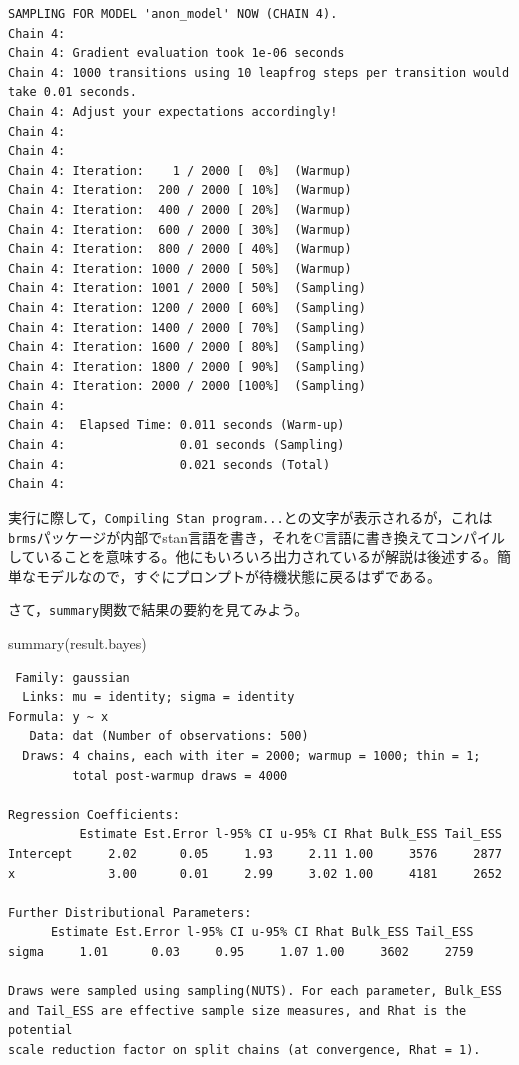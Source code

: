 \documentclass[
  a4paper,
]{ltjsbook}
\newenvironment{Shaded}{\begin{snugshade}}{\end{snugshade}}
\newcommand{\FunctionTok}[1]{\textcolor[rgb]{0.28,0.35,0.67}{#1}}
\newcommand{\NormalTok}[1]{\textcolor[rgb]{0.00,0.23,0.31}{#1}}
\begin{document}
\begin{verbatim}
SAMPLING FOR MODEL 'anon_model' NOW (CHAIN 4).
Chain 4: 
Chain 4: Gradient evaluation took 1e-06 seconds
Chain 4: 1000 transitions using 10 leapfrog steps per transition would take 0.01 seconds.
Chain 4: Adjust your expectations accordingly!
Chain 4: 
Chain 4: 
Chain 4: Iteration:    1 / 2000 [  0%]  (Warmup)
Chain 4: Iteration:  200 / 2000 [ 10%]  (Warmup)
Chain 4: Iteration:  400 / 2000 [ 20%]  (Warmup)
Chain 4: Iteration:  600 / 2000 [ 30%]  (Warmup)
Chain 4: Iteration:  800 / 2000 [ 40%]  (Warmup)
Chain 4: Iteration: 1000 / 2000 [ 50%]  (Warmup)
Chain 4: Iteration: 1001 / 2000 [ 50%]  (Sampling)
Chain 4: Iteration: 1200 / 2000 [ 60%]  (Sampling)
Chain 4: Iteration: 1400 / 2000 [ 70%]  (Sampling)
Chain 4: Iteration: 1600 / 2000 [ 80%]  (Sampling)
Chain 4: Iteration: 1800 / 2000 [ 90%]  (Sampling)
Chain 4: Iteration: 2000 / 2000 [100%]  (Sampling)
Chain 4: 
Chain 4:  Elapsed Time: 0.011 seconds (Warm-up)
Chain 4:                0.01 seconds (Sampling)
Chain 4:                0.021 seconds (Total)
Chain 4: 
\end{verbatim}

実行に際して，\texttt{Compiling\ Stan\ program...}との文字が表示されるが，これは\texttt{brms}パッケージが内部でstan言語を書き，それをC言語に書き換えてコンパイルしていることを意味する。他にもいろいろ出力されているが解説は後述する。簡単なモデルなので，すぐにプロンプトが待機状態に戻るはずである。

さて，\texttt{summary}関数で結果の要約を見てみよう。

\begin{Shaded}
\begin{Highlighting}[]
\FunctionTok{summary}\NormalTok{(result.bayes)}
\end{Highlighting}
\end{Shaded}

\begin{verbatim}
 Family: gaussian 
  Links: mu = identity; sigma = identity 
Formula: y ~ x 
   Data: dat (Number of observations: 500) 
  Draws: 4 chains, each with iter = 2000; warmup = 1000; thin = 1;
         total post-warmup draws = 4000

Regression Coefficients:
          Estimate Est.Error l-95% CI u-95% CI Rhat Bulk_ESS Tail_ESS
Intercept     2.02      0.05     1.93     2.11 1.00     3576     2877
x             3.00      0.01     2.99     3.02 1.00     4181     2652

Further Distributional Parameters:
      Estimate Est.Error l-95% CI u-95% CI Rhat Bulk_ESS Tail_ESS
sigma     1.01      0.03     0.95     1.07 1.00     3602     2759

Draws were sampled using sampling(NUTS). For each parameter, Bulk_ESS
and Tail_ESS are effective sample size measures, and Rhat is the potential
scale reduction factor on split chains (at convergence, Rhat = 1).
\end{verbatim}
\end{document}
